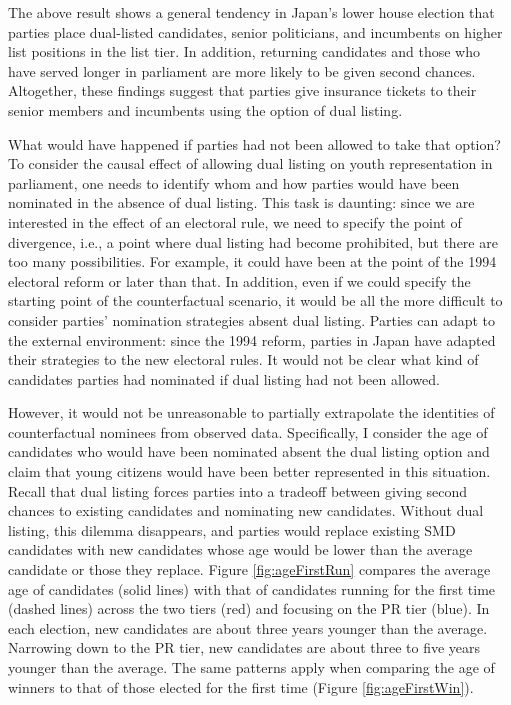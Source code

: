 \documentclass[a4paper, 11pt]{article}
\begin{document}
The above result shows a general tendency in Japan's lower house election that parties place dual-listed candidates, senior politicians, and incumbents on higher list positions in the list tier. In addition, returning candidates and those who have served longer in parliament are more likely to be given second chances. Altogether, these findings suggest that parties give insurance tickets to their senior members and incumbents using the option of dual listing. 

What would have happened if parties had not been allowed to take that option? To consider the causal effect of allowing dual listing on youth representation in parliament, one needs to identify whom and how parties would have been nominated in the absence of dual listing. This task is daunting: since we are interested in the effect of an electoral rule, we need to specify the point of divergence, i.e., a point where dual listing had become prohibited, but there are too many possibilities. For example, it could have been at the point of the 1994 electoral reform or later than that. In addition, even if we could specify the starting point of the counterfactual scenario, it would be all the more difficult to consider parties' nomination strategies absent dual listing. Parties can adapt to the external environment: since the 1994 reform, parties in Japan have adapted their strategies to the new electoral rules. It would not be clear what kind of candidates parties had nominated if dual listing had not been allowed. 

However, it would not be unreasonable to partially extrapolate the identities of counterfactual nominees from observed data. Specifically, I consider the age of candidates who would have been nominated absent the dual listing option and claim that young citizens would have been better represented in this situation. Recall that dual listing forces parties into a tradeoff between giving second chances to existing candidates and nominating new candidates. Without dual listing, this dilemma disappears, and parties would replace existing SMD candidates with new candidates whose age would be lower than the average candidate or those they replace. Figure \ref{fig:ageFirstRun} compares the average age of candidates (solid lines) with that of candidates running for the first time (dashed lines) across the two tiers (red) and focusing on the PR tier (blue). In each election, new candidates are about three years younger than the average. Narrowing down to the PR tier, new candidates are about three to five years younger than the average. The same patterns apply when comparing the age of winners to that of those elected for the first time (Figure \ref{fig:ageFirstWin}). 
\end{document}
